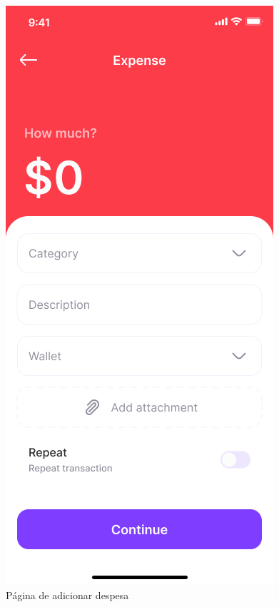 \begin{figure}[!htb]
    \centering
    \caption{Página de adicionar despesa}
    \includegraphics[scale=0.3]{images/expense.png}
\end{figure}

